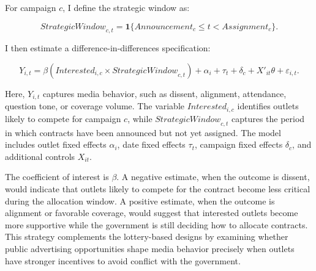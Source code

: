 For campaign \(c\), I define the strategic window as:

\[
\textit{StrategicWindow}_{c,t}
=
\mathbf{1}\{Announcement_c \leq t < Assignment_c\}.
\]

I then estimate a difference-in-differences specification:

\[
Y_{i,t}
=
\beta
\left(
\textit{Interested}_{i,c}
\times
\textit{StrategicWindow}_{c,t}
\right)
+
\alpha_i
+
\tau_t
+
\delta_c
+
X'_{it}\theta
+
\varepsilon_{i,t}.
\]

Here, \(Y_{i,t}\) captures media behavior, such as dissent, alignment, attendance, question tone, or coverage volume. The variable \(\textit{Interested}_{i,c}\) identifies outlets likely to compete for campaign \(c\), while \(\textit{StrategicWindow}_{c,t}\) captures the period in which contracts have been announced but not yet assigned. The model includes outlet fixed effects \(\alpha_i\), date fixed effects \(\tau_t\), campaign fixed effects \(\delta_c\), and additional controls \(X_{it}\).

The coefficient of interest is \(\beta\). A negative estimate, when the outcome is dissent, would indicate that outlets likely to compete for the contract become less critical during the allocation window. A positive estimate, when the outcome is alignment or favorable coverage, would suggest that interested outlets become more supportive while the government is still deciding how to allocate contracts. This strategy complements the lottery-based designs by examining whether public advertising opportunities shape media behavior precisely when outlets have stronger incentives to avoid conflict with the government.